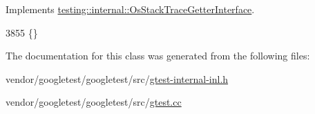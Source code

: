 Implements \hyperlink{classtesting_1_1internal_1_1OsStackTraceGetterInterface_a791bd120428b5a53d5eeba1b27296a39}{testing\+::internal\+::\+Os\+Stack\+Trace\+Getter\+Interface}.


\begin{DoxyCode}
3855 \{\}
\end{DoxyCode}


The documentation for this class was generated from the following files\+:\begin{DoxyCompactItemize}
\item 
vendor/googletest/googletest/src/\hyperlink{gtest-internal-inl_8h}{gtest-\/internal-\/inl.\+h}\item 
vendor/googletest/googletest/src/\hyperlink{gtest_8cc}{gtest.\+cc}\end{DoxyCompactItemize}
